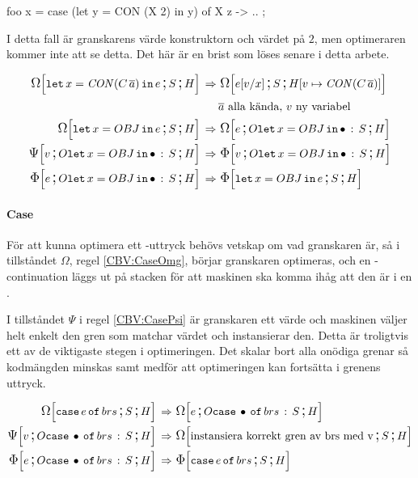 \documentclass[../Optimise]{subfiles}
\begin{document}
\begin{codeEx}
foo x = case (let y = CON (X 2) in y) of
    { X z -> ..
    };
\end{codeEx} 

I detta fall är granskarens värde konstruktorn  och värdet på  $2$, men optimeraren
kommer inte att se detta. Det här är en brist som löses senare i detta arbete.

\begin{align}
\label{CBV:OLet1} \OMEGA SH{\eLet x{\CON{C}{\many{a}}}{e}}  \rulesep &\, \OMEGA S{\heap{v}{\CON{C}{\many{a}}}}{e[v/x]}\\
 & \many{a} \text{ alla kända, } v \text{ ny variabel} \nonumber \\
\label{CBV:OLet2}\OMEGA SH{\eLet x{OBJ}{e}}  \rulesep &\, \OMEGA{\oLetObj x{OBJ}S}He\\
\label{CBV:OLet3}\PSI{\oLetObj x{OBJ}S}Hv  \rulesep &\, \IRR{\oLetObj x{OBJ}S}Hv\\
\label{CBV:OLet4}\IRR{\oLetObj x{OBJ}S}He  \rulesep &\, \IRR SH{\eLet x{OBJ}e}
\end{align}


\paragraph{Case}
\label{cbv:case}
För att kunna optimera ett -uttryck behövs vetskap om vad granskaren är,
så i tillståndet $\Omega$, regel \eqref{CBV:CaseOmg}, börjar granskaren optimeras, och en
-continuation läggs ut på stacken för att maskinen ska komma ihåg att den är i en .

I tillståndet $\Psi$ i regel \eqref{CBV:CasePsi} är granskaren ett värde och maskinen väljer helt
enkelt den gren som matchar värdet och instansierar den.
Detta är troligtvis ett av de viktigaste stegen i optimeringen. 
Det skalar bort alla onödiga grenar så kodmängden minskas
samt medför att optimeringen kan fortsätta i grenens uttryck.

\begin{align}
\label{CBV:CaseOmg} \OMEGA SH{\eCase e{brs}} \rulesep &\, \OMEGA{\oCase{brs}S}He\\
\label{CBV:CasePsi} \PSI{\oCase{brs}S}Hv \rulesep &\, \OMEGA SH{\text{instansiera korrekt gren av brs med v}} \\
\label{CBV:CaseIrr} \IRR{\oCase{brs}S}He \rulesep &\, \IRR SH{\eCase e brs}
\end{align}
\end{document}
